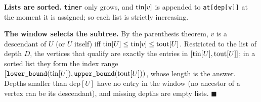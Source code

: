 \begin{invariantbox}
\textbf{Lists are sorted.} \texttt{timer} only grows, and $\mathrm{tin}[v]$ is appended to \texttt{at[dep[v]]} at the moment it is assigned; so each list is strictly increasing.

\textbf{The window selects the subtree.} By the parenthesis theorem, $v$ is a descendant of $U$ (or $U$ itself) iff $\mathrm{tin}[U] \le \mathrm{tin}[v] \le \mathrm{tout}[U]$. Restricted to the list of depth $D$, the vertices that qualify are exactly the entries in $[\mathrm{tin}[U], \mathrm{tout}[U]]$; in a sorted list they form the index range $[\texttt{lower\_bound}(\mathrm{tin}[U]), \texttt{upper\_bound}(\mathrm{tout}[U]))$, whose length is the answer. Depths smaller than $\mathrm{dep}[U]$ have no entry in the window (no ancestor of a vertex can be its descendant), and missing depths are empty lists. \hfill$\blacksquare$
\end{invariantbox}

